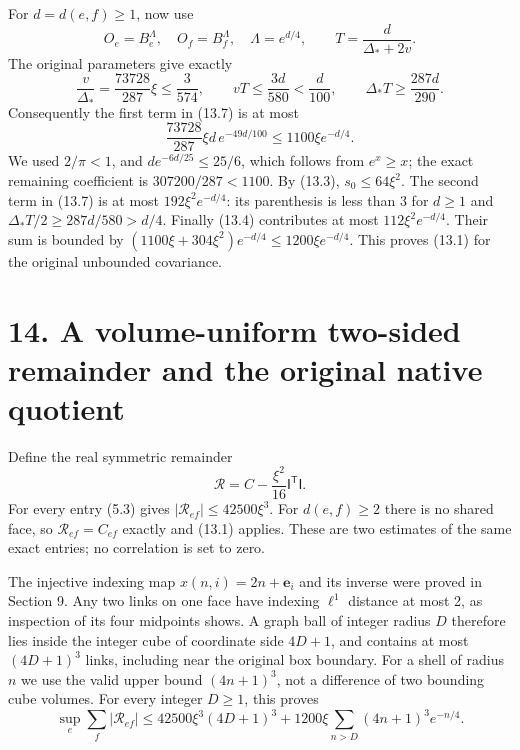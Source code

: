 \documentclass[
]{article}
\begin{document}
For \(d=d(e,f)\ge1\), now use \[
O_e=B_e^\Lambda,\quad O_f=B_f^\Lambda,\quad
\Lambda=e^{d/4},\qquad T=\frac{d}{\Delta_*+2v}.
\] The original parameters give exactly \[
\frac v{\Delta_*}=\frac{73728}{287}\xi\le\frac3{574},\qquad
vT\le\frac{3d}{580}<\frac d{100},\qquad
\Delta_*T\ge\frac{287d}{290}.                                \tag{13.8}
\] Consequently the first term in (13.7) is at most \[
\frac{73728}{287}\xi d\,e^{-49d/100}
\le1100\xi e^{-d/4}.
\] We used \(2/\pi<1\), and \(d e^{-6d/25}\le25/6\), which follows from
\(e^x\ge x\); the exact remaining coefficient is \(307200/287<1100\). By
(13.3), \(s_0\le64\xi^2\). The second term in (13.7) is at most
\(192\xi^2e^{-d/4}\): its parenthesis is less than \(3\) for \(d\ge1\)
and \(\Delta_*T/2\ge287d/580>d/4\). Finally (13.4) contributes at most
\(112\xi^2e^{-d/4}\). Their sum is bounded by
\((1100\xi+304\xi^2)e^{-d/4}\le1200\xi e^{-d/4}\). This proves (13.1)
for the original unbounded covariance.

\section{14. A volume-uniform two-sided remainder and the original
native
quotient}\label{a-volume-uniform-two-sided-remainder-and-the-original-native-quotient}

Define the real symmetric remainder \[
\mathscr R=C-\frac{\xi^2}{16}\mathsf I^{\mathsf T}\mathsf I.
\] For every entry (5.3) gives \(|\mathscr R_{ef}|\le42500\xi^3\). For
\(d(e,f)\ge2\) there is no shared face, so \(\mathscr R_{ef}=C_{ef}\)
exactly and (13.1) applies. These are two estimates of the same exact
entries; no correlation is set to zero.

The injective indexing map \(x(n,i)=2n+\mathbf e_i\) and its inverse
were proved in Section 9. Any two links on one face have indexing
\(\ell^1\) distance at most 2, as inspection of its four midpoints
shows. A graph ball of integer radius \(D\) therefore lies inside the
integer cube of coordinate side \(4D+1\), and contains at most
\((4D+1)^3\) links, including near the original box boundary. For a
shell of radius \(n\) we use the valid upper bound \((4n+1)^3\), not a
difference of two bounding cube volumes. For every integer \(D\ge1\),
this proves \[
\sup_e\sum_f|\mathscr R_{ef}|
\le42500\xi^3(4D+1)^3+
1200\xi\sum_{n>D}(4n+1)^3e^{-n/4}.                           \tag{14.1}
\]
\end{document}
